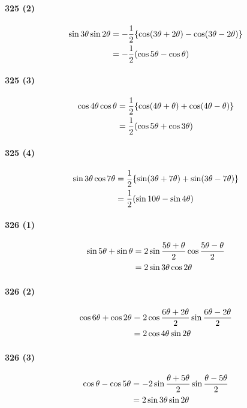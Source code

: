 \documentclass[fleqn,a4j,dvipdfmx,uplatex,twocolumn]{jsarticle}
\def\nr{\notag\\}%
\begin{document}
\paragraph{325 (2)}
\begin{align*}
  \sin 3\theta \sin 2\theta &= -\frac{1}{2} \{ \cos (3\theta + 2\theta) - \cos (3\theta - 2\theta) \} \nr
  &= -\frac{1}{2} (\cos 5\theta - \cos \theta)
\end{align*}

\paragraph{325 (3)}
\begin{align*}
  \cos 4\theta \cos \theta &= \frac{1}{2} \{ \cos (4\theta + \theta) + \cos (4\theta - \theta) \} \nr
  &= \frac{1}{2} (\cos 5\theta + \cos 3\theta)
\end{align*}

\paragraph{325 (4)}
\begin{align*}
  \sin 3\theta \cos 7\theta &= \frac{1}{2} \{ \sin (3\theta + 7\theta) + \sin (3\theta - 7\theta) \} \nr
  &= \frac{1}{2} (\sin 10\theta - \sin 4\theta)
\end{align*}

\paragraph{326 (1)}
\begin{align*}
  \sin 5\theta + \sin \theta &= 2 \sin \frac{5\theta + \theta}{2} \cos \frac{5\theta - \theta}{2} \nr
  &= 2 \sin 3\theta \cos 2\theta
\end{align*}

\paragraph{326 (2)}
\begin{align*}
  \cos 6\theta + \cos 2\theta &= 2 \cos \frac{6\theta + 2\theta}{2} \sin \frac{6\theta - 2\theta}{2} \nr
  &= 2 \cos 4\theta \sin 2\theta
\end{align*}

\paragraph{326 (3)}
\begin{align*}
  \cos \theta - \cos 5\theta &= -2 \sin \frac{\theta + 5\theta}{2} \sin \frac{\theta - 5\theta}{2} \nr
  &= 2 \sin 3\theta \sin 2\theta
\end{align*}
\end{document}
